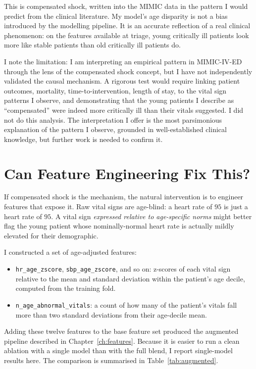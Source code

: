 This is compensated shock, written into the MIMIC data in the pattern I would predict from the clinical literature. My model's age disparity is not a bias introduced by the modelling pipeline. It is an accurate reflection of a real clinical phenomenon: on the features available at triage, young critically ill patients look more like stable patients than old critically ill patients do.

I note the limitation: I am interpreting an empirical pattern in MIMIC-IV-ED through the lens of the compensated shock concept, but I have not independently validated the causal mechanism. A rigorous test would require linking patient outcomes, mortality, time-to-intervention, length of stay, to the vital sign patterns I observe, and demonstrating that the young patients I describe as ``compensated'' were indeed more critically ill than their vitals suggested. I did not do this analysis. The interpretation I offer is the most parsimonious explanation of the pattern I observe, grounded in well-established clinical knowledge, but further work is needed to confirm it.

\section{Can Feature Engineering Fix This?}

If compensated shock is the mechanism, the natural intervention is to engineer features that expose it. Raw vital signs are age-blind: a heart rate of $95$ is just a heart rate of $95$. A vital sign \emph{expressed relative to age-specific norms} might better flag the young patient whose nominally-normal heart rate is actually mildly elevated for their demographic.

I constructed a set of age-adjusted features:

\begin{itemize}
 \item \texttt{hr\_age\_zscore}, \texttt{sbp\_age\_zscore}, and so on: z-scores of each vital sign relative to the mean and standard deviation within the patient's age decile, computed from the training fold.
 \item \texttt{n\_age\_abnormal\_vitals}: a count of how many of the patient's vitals fall more than two standard deviations from their age-decile mean.
\end{itemize}

Adding these twelve features to the base feature set produced the augmented pipeline described in Chapter~\ref{ch:features}. Because it is easier to run a clean ablation with a single model than with the full blend, I report single-model results here. The comparison is summarised in Table~\ref{tab:augmented}.

